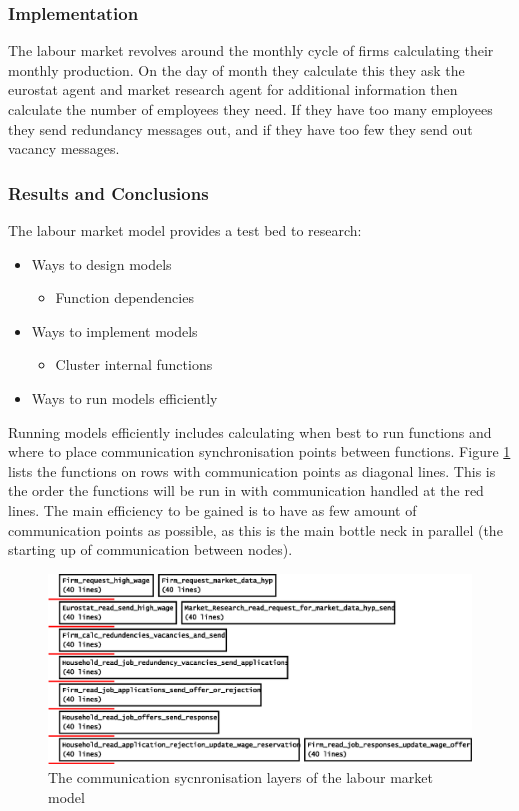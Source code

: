 \documentclass[a4paper,11pt]{article}
\begin{document}
\subsubsection{Implementation}

The labour market revolves around the monthly cycle of firms
calculating their monthly production. On the day of month they
calculate this they ask the eurostat agent and market research agent
for additional information then calculate the number of employees
they need. If they have too many employees they send redundancy
messages out, and if they have too few they send out vacancy
messages.

\subsubsection{Results and Conclusions}

The labour market model provides a test bed to research:
\begin{itemize}
\item Ways to design models
\begin{itemize}
          \item Function dependencies
          \end{itemize}
\item Ways to implement models
\begin{itemize}
          \item Cluster internal functions
          \end{itemize}
    \item Ways to run models efficiently
\end{itemize}
Running models efficiently includes calculating when best to run
functions and where to place communication synchronisation points
between functions. Figure \ref{fig:xalmsync} lists the functions on rows with
communication points as diagonal lines. This is the order the functions
will be run in with communication handled at the red lines. The main
efficiency to be gained is to have as few amount of communication
points as possible, as this is the main bottle neck in parallel (the
starting up of communication between nodes).


\begin{figure}
\begin{center}
\includegraphics*[scale=0.7]{labour_market_com_layers.eps}
\caption{The communication sycnronisation layers of the labour market model} \label{fig:xalmsync}
\end{center}
\end{figure}
\end{document}
